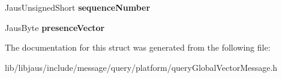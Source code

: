 \begin{DoxyCompactItemize}
\item 
\hypertarget{struct_query_global_vector_message_struct_a62ae9c5092b40b155529657d58bd9a3a}{\-Jaus\-Unsigned\-Short {\bfseries sequence\-Number}}\label{struct_query_global_vector_message_struct_a62ae9c5092b40b155529657d58bd9a3a}

\item 
\hypertarget{struct_query_global_vector_message_struct_a42c2c55ea037b81b8da3a32ce538372c}{\-Jaus\-Byte {\bfseries presence\-Vector}}\label{struct_query_global_vector_message_struct_a42c2c55ea037b81b8da3a32ce538372c}

\end{DoxyCompactItemize}


\-The documentation for this struct was generated from the following file\-:\begin{DoxyCompactItemize}
\item 
lib/libjaus/include/message/query/platform/query\-Global\-Vector\-Message.\-h\end{DoxyCompactItemize}
